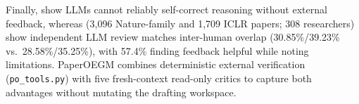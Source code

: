 Finally, \citet{huang2024selfcorrect} show LLMs cannot reliably self-correct reasoning without external feedback, whereas \citet{liang2024feedback} (3,096 Nature-family and 1,709 ICLR papers; 308 researchers) show independent LLM review matches inter-human overlap (30.85\%/39.23\% vs.~28.58\%/35.25\%), with 57.4\% finding feedback helpful while noting limitations. PaperOEGM combines deterministic external verification (\texttt{po\_\allowbreak{}tools.\allowbreak{}py}) with five fresh-context read-only critics to capture both advantages without mutating the drafting workspace.
